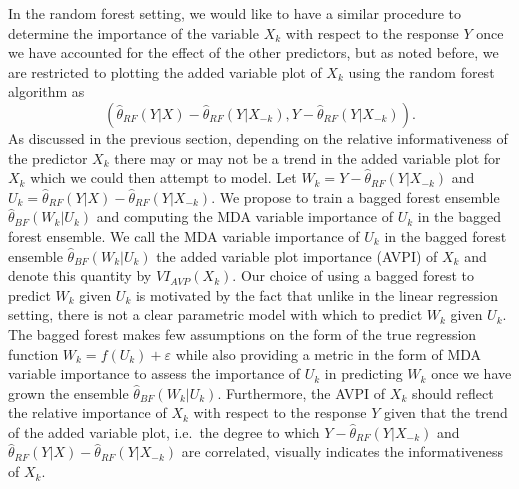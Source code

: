 \documentclass[12pt,twoside]{reedthesis}
\theoremstyle{definition}
\theoremstyle{definition}
\theoremstyle{definition}
\theoremstyle{remark}
\begin{document}
In the random forest setting, we would like to have a similar procedure
to determine the importance of the variable \(X_k\) with respect to the
response \(Y\) once we have accounted for the effect of the other
predictors, but as noted before, we are restricted to plotting the added
variable plot of \(X_k\) using the random forest algorithm as
\[(\hat{\theta}_{RF}(Y|X)-\hat{\theta}_{RF}(Y|X_{-k}), Y-\hat{\theta}_{RF}(Y|X_{-k})).\]
As discussed in the previous section, depending on the relative
informativeness of the predictor \(X_k\) there may or may not be a trend
in the added variable plot for \(X_k\) which we could then attempt to
model. Let \(W_k=Y-\hat{\theta}_{RF}(Y|X_{-k})\) and
\(U_k=\hat{\theta}_{RF}(Y|X)-\hat{\theta}_{RF}(Y|X_{-k})\). We propose
to train a bagged forest ensemble \(\hat{\theta}_{BF}(W_k|U_k)\) and
computing the MDA variable importance of \(U_k\) in the bagged forest
ensemble. We call the MDA variable importance of \(U_k\) in the bagged
forest ensemble \(\hat{\theta}_{BF}(W_k|U_k)\) the added variable plot
importance (AVPI) of \(X_k\) and denote this quantity by
\(VI_{AVP}(X_k)\). Our choice of using a bagged forest to predict
\(W_k\) given \(U_k\) is motivated by the fact that unlike in the linear
regression setting, there is not a clear parametric model with which to
predict \(W_k\) given \(U_k\). The bagged forest makes few assumptions
on the form of the true regression function \(W_k=f(U_k)+\varepsilon\)
while also providing a metric in the form of MDA variable importance to
assess the importance of \(U_k\) in predicting \(W_k\) once we have
grown the ensemble \(\hat{\theta}_{BF}(W_k|U_k)\). Furthermore, the AVPI
of \(X_k\) should reflect the relative importance of \(X_k\) with
respect to the response \(Y\) given that the trend of the added variable
plot, i.e.~the degree to which \(Y-\hat{\theta}_{RF}(Y|X_{-k})\) and
\(\hat{\theta}_{RF}(Y|X)-\hat{\theta}_{RF}(Y|X_{-k})\) are correlated,
visually indicates the informativeness of \(X_k\).
\end{document}
